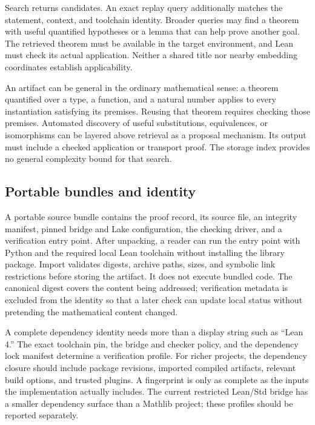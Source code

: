 \documentclass[10pt,a4paper]{article}
\begin{document}
Search returns candidates. An exact replay query additionally matches the
statement, context, and toolchain identity. Broader queries may find a theorem
with useful quantified hypotheses or a lemma that can help prove another goal.
The retrieved theorem must be available in the target environment, and Lean
must check its actual application. Neither a shared title nor nearby embedding
coordinates establish applicability.

An artifact can be general in the ordinary mathematical sense: a theorem
quantified over a type, a function, and a natural number applies to every
instantiation satisfying its premises. Reusing that theorem requires checking
those premises. Automated discovery of useful substitutions, equivalences, or
isomorphisms can be layered above retrieval as a proposal mechanism. Its output
must include a checked application or transport proof. The storage index
provides no general complexity bound for that search.

\subsection{Portable bundles and identity}
A portable source bundle contains the proof record, its source file, an
integrity manifest, pinned bridge and Lake configuration, the checking driver,
and a verification entry point. After unpacking, a reader can run the entry
point with Python and the required local Lean toolchain without installing the
library package. Import validates digests, archive paths, sizes, and symbolic
link restrictions before storing the artifact. It does not execute bundled
code. The canonical digest covers the content being addressed; verification
metadata is excluded from the identity so that a later check can update local
status without pretending the mathematical content changed.

A complete dependency identity needs more than a display string such as
``Lean 4.'' The exact toolchain pin, the bridge and checker policy, and the
dependency lock manifest determine a verification profile. For richer projects,
the dependency closure should include package revisions, imported compiled
artifacts, relevant build options, and trusted plugins. A fingerprint is only as
complete as the inputs the implementation actually includes. The current
restricted Lean/Std bridge has a smaller dependency surface than a Mathlib
project; these profiles should be reported separately.
\end{document}
